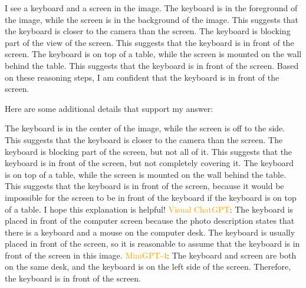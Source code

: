 \begin{enumerate}
    I see a keyboard and a screen in the image.
    The keyboard is in the foreground of the image, while the screen is in the background of the image. This suggests that the keyboard is closer to the camera than the screen.
    The keyboard is blocking part of the view of the screen. This suggests that the keyboard is in front of the screen.
    The keyboard is on top of a table, while the screen is mounted on the wall behind the table. This suggests that the keyboard is in front of the screen.
    Based on these reasoning steps, I am confident that the keyboard is in front of the screen.
    
    Here are some additional details that support my answer:
    
    The keyboard is in the center of the image, while the screen is off to the side. This suggests that the keyboard is closer to the camera than the screen.
    The keyboard is blocking part of the screen, but not all of it. This suggests that the keyboard is in front of the screen, but not completely covering it.
    The keyboard is on top of a table, while the screen is mounted on the wall behind the table. This suggests that the keyboard is in front of the screen, because it would be impossible for the screen to be in front of the keyboard if the keyboard is on top of a table.
    I hope this explanation is helpful!
    \subitem \textcolor{orange}{Visual ChatGPT}: The keyboard is placed in front of the computer screen because the photo description states that there is a keyboard and a mouse on the computer desk. The keyboard is usually placed in front of the screen, so it is reasonable to assume that the keyboard is in front of the screen in this image.
    \subitem \textcolor{orange}{MiniGPT-4}: The keyboard and screen are both on the same desk, and the keyboard is on the left side of the screen. Therefore, the keyboard is in front of the screen.
\end{enumerate}
